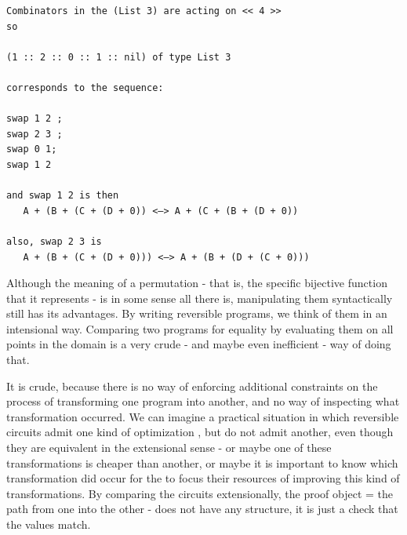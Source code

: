 








\begin{verbatim}
Combinators in the (List 3) are acting on << 4 >>
so

(1 :: 2 :: 0 :: 1 :: nil) of type List 3

corresponds to the sequence:

swap 1 2 ;
swap 2 3 ;
swap 0 1;
swap 1 2

and swap 1 2 is then
   A + (B + (C + (D + 0)) <—> A + (C + (B + (D + 0))

also, swap 2 3 is
   A + (B + (C + (D + 0))) <—> A + (B + (D + (C + 0)))
\end{verbatim}

Although the meaning of a permutation - that is, the specific bijective function
that it represents - is in some sense all there is, manipulating them
syntactically still has its advantages. By writing reversible programs, we think
of them in an intensional way. Comparing two programs for equality by evaluating
them on all points in the domain is a very crude - and maybe even inefficient -
way of doing that.

It is crude, because there is no way of enforcing additional constraints on the
process of transforming one program into another, and no way of inspecting what
transformation occurred. We can imagine a practical situation in which reversible
circuits admit one kind of optimization , but do not admit another,
even though they are equivalent in the extensional sense - or maybe one of these
transformations is cheaper than another, or maybe it is important to know which
transformation did occur for the  to focus their resources of
improving this kind of transformations. By comparing the circuits extensionally,
the proof object = the path from one into the other - does not have any
structure,  it is just a check that the values match.

